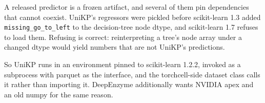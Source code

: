 A released predictor is a frozen artifact, and several of them pin dependencies that cannot
coexist. UniKP's regressors were pickled before scikit-learn 1.3 added
\texttt{missing\_go\_to\_left} to the decision-tree node dtype, and scikit-learn 1.7
refuses to load them. Refusing is correct: reinterpreting a tree's node array under a
changed dtype would yield numbers that are not UniKP's predictions.

So UniKP runs in an environment pinned to scikit-learn 1.2.2, invoked as a subprocess with
parquet as the interface, and the torchcell-side dataset class calls it rather than
importing it. DeepEnzyme additionally wants NVIDIA apex and an old numpy
for the same reason.
